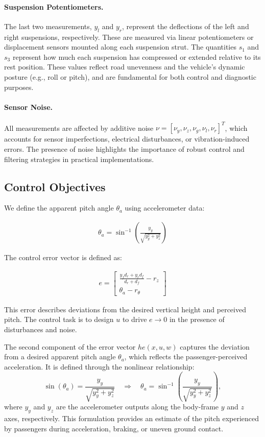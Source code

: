 \documentclass[]{report}
\begin{document}
\paragraph{Suspension Potentiometers.}
The last two measurements, $y_l$ and $y_r$, represent the deflections of the left and right suspensions, respectively. These are measured via linear potentiometers or displacement sensors mounted along each suspension strut. The quantities $s_1$ and $s_3$ represent how much each suspension has compressed or extended relative to its rest position. These values reflect road unevenness and the vehicle's dynamic posture (e.g., roll or pitch), and are fundamental for both control and diagnostic purposes.

\paragraph{Sensor Noise.}
All measurements are affected by additive noise $\nu = [\nu_y, \nu_z, \nu_g, \nu_l, \nu_r]^T$, which accounts for sensor imperfections, electrical disturbances, or vibration-induced errors. The presence of noise highlights the importance of robust control and filtering strategies in practical implementations.

\newpage
\subsection{Control Objectives}

We define the apparent pitch angle $\theta_a$ using accelerometer data:

\begin{align}
	\theta_a = \sin^{-1} \left( \frac{y_y}{\sqrt{y_y^2 + y_z^2}} \right)
\end{align}

The control error vector is defined as:

\begin{align}
	e = \begin{bmatrix}
		\frac{y_f d_r + y_r d_f}{d_r + d_f} - r_z \\
		\theta_a - r_\theta
	\end{bmatrix}
\end{align}

This error describes deviations from the desired vertical height and perceived pitch. The control task is to design $u$ to drive $e \rightarrow 0$ in the presence of disturbances and noise.

The second component of the error vector $he(x,u,w)$ captures the deviation from a desired apparent pitch angle $\theta_a$, which reflects the passenger-perceived acceleration. It is defined through the nonlinear relationship:
\[
\sin(\theta_a) = \frac{y_y}{\sqrt{y_y^2 + y_z^2}} \quad \Rightarrow \quad \theta_a = \sin^{-1}\left(\frac{y_y}{\sqrt{y_y^2 + y_z^2}}\right),
\]
where $y_y$ and $y_z$ are the accelerometer outputs along the body-frame $y$ and $z$ axes, respectively. This formulation provides an estimate of the pitch experienced by passengers during acceleration, braking, or uneven ground contact.
\end{document}
